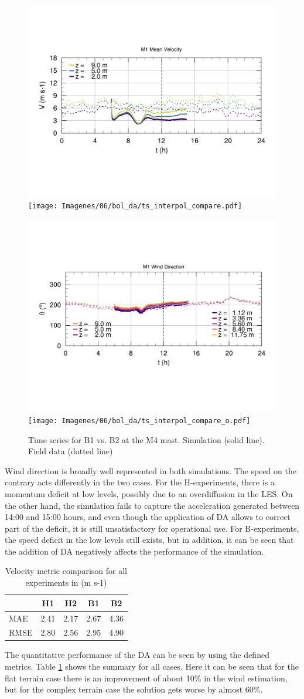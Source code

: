 \begin{figure}[H]
	\centering
	\includegraphics[width=0.5\linewidth,trim={7mm 68mm 10mm 55mm},page=3,clip]{Imagenes/06/bol/ts_interpol_compare.pdf}%
	\texttt{[image: Imagenes/06/bol\_da/ts\_interpol\_compare.pdf]}%
	
	\includegraphics[width=0.5\linewidth,trim={12mm 48mm 10mm 55mm},page=3,clip]{Imagenes/06/bol/ts_interpol_compare_o.pdf}%
	\texttt{[image: Imagenes/06/bol\_da/ts\_interpol\_compare\_o.pdf]}%
	\caption{Time series for B1 vs. B2 at the M4 mast. Simulation (solid line). Field data (dotted line)}
	\label{fig:06_bol_ts_m4}
\end{figure}
Wind direction is broadly well represented in both simulations. The speed on the contrary acts differently in the two cases. For the H-experiments, there is a momentum deficit at low levels, possibly due to an overdiffusion in the LES. On the other hand, the simulation fails to capture the acceleration generated between 14:00 and 15:00 hours, and even though the application of DA allows to correct part of the deficit, it is still unsatisfactory for operational use. For B-experiments, the speed deficit in the low levels still exists, but in addition, it can be seen that the addition of DA negatively affects the performance of the simulation.
\begin{table}[H]
	\caption{Velocity metric comparison for all experiments in (m s-1)}
	\label{tab:06_bol_mae_rmse}
	\centering%
	\begin{tabular}{lcccc}
		\toprule
		& H1 & H2 & B1 & B2\\
		\midrule
		MAE& 2.41& 2.17 & 2.67 & 4.36 \\
		RMSE& 2.80& 2.56& 2.95& 4.90 \\
		\bottomrule
	\end{tabular}
\end{table}
The quantitative performance of the DA can be seen by using the defined metrics. Table \ref{tab:06_bol_mae_rmse} shows the summary for all cases. Here it can be seen that for the flat terrain case there is an improvement of about 10\% in the wind estimation, but for the complex terrain case the solution gets worse by almost 60\%. 


